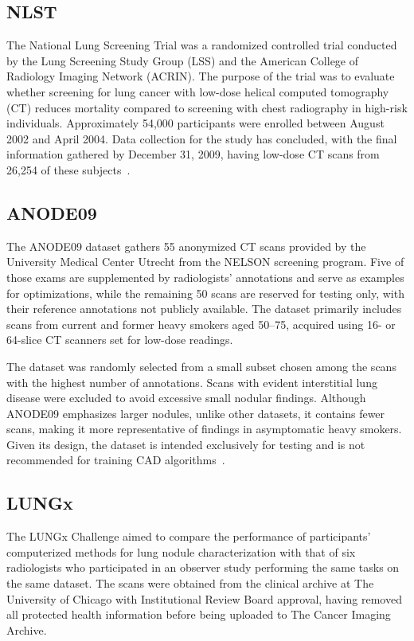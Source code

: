 \subsection{NLST}\label{nlst}
The National Lung Screening Trial was a randomized controlled trial conducted by the Lung Screening Study Group (LSS) and the American College of Radiology Imaging Network (ACRIN). The purpose of the trial was to evaluate whether screening for lung cancer with low-dose helical computed tomography (CT) reduces mortality compared to screening with chest radiography in high-risk individuals. 
Approximately 54,000 participants were enrolled between August 2002 and April 2004. Data collection for the study has concluded, with the final information gathered by December 31, 2009, having low-dose CT scans from 26,254 of these subjects~\cite{national_lung_screening_trial_research_team_data_2013, national_lung_screening_trial_research_team_reduced_2011}.

\subsection{ANODE09}\label{anode09}
The ANODE09 dataset gathers 55 anonymized CT scans provided by the University Medical Center Utrecht from the NELSON screening program. Five of those exams are supplemented by radiologists' annotations and serve as examples for optimizations, while the remaining 50 scans are reserved for testing only, with their reference annotations not publicly available. The dataset primarily includes scans from current and former heavy smokers aged 50–75, acquired using 16- or 64-slice CT scanners set for low-dose readings.

The dataset was randomly selected from a small subset chosen among the scans with the highest number of annotations. Scans with evident interstitial lung disease were excluded to avoid excessive small nodular findings. Although ANODE09 emphasizes larger nodules, unlike other datasets, it contains fewer scans, making it more representative of findings in asymptomatic heavy smokers. Given its design, the dataset is intended exclusively for testing and is not recommended for training CAD algorithms~\cite{ginneken_comparing_2010}.

\subsection{LUNGx}\label{lungx}
The LUNGx Challenge aimed to compare the performance of participants’ computerized methods for lung nodule characterization with that of six radiologists who participated in an observer study performing the same tasks on the same dataset. The scans were obtained from the clinical archive at The University of Chicago with Institutional Review Board approval, having removed all protected health information before being uploaded to The Cancer Imaging Archive. %

